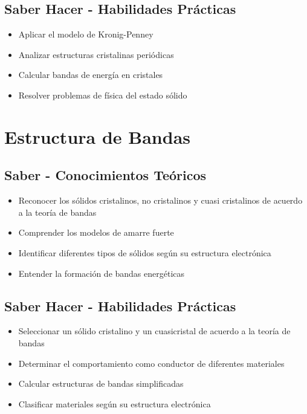 \documentclass[12pt,a4paper,twoside]{book}
\begin{document}
	\subsection{Saber Hacer - Habilidades Prácticas}
	\begin{hacerbox}
		\begin{itemize}
			\item Aplicar el modelo de Kronig-Penney
			\item Analizar estructuras cristalinas periódicas
			\item Calcular bandas de energía en cristales
			\item Resolver problemas de física del estado sólido
		\end{itemize}
	\end{hacerbox}
	
	\section{Estructura de Bandas}
	\label{sec:estructura_bandas}
	
	\subsection{Saber - Conocimientos Teóricos}
	\begin{saberbox}
		\begin{itemize}
			\item Reconocer los sólidos cristalinos, no cristalinos y cuasi cristalinos de acuerdo a la teoría de bandas
			\item Comprender los modelos de amarre fuerte
			\item Identificar diferentes tipos de sólidos según su estructura electrónica
			\item Entender la formación de bandas energéticas
		\end{itemize}
	\end{saberbox}
	
	\subsection{Saber Hacer - Habilidades Prácticas}
	\begin{hacerbox}
		\begin{itemize}
			\item Seleccionar un sólido cristalino y un cuasicristal de acuerdo a la teoría de bandas
			\item Determinar el comportamiento como conductor de diferentes materiales
			\item Calcular estructuras de bandas simplificadas
			\item Clasificar materiales según su estructura electrónica
		\end{itemize}
	\end{hacerbox}
	
\end{document}

